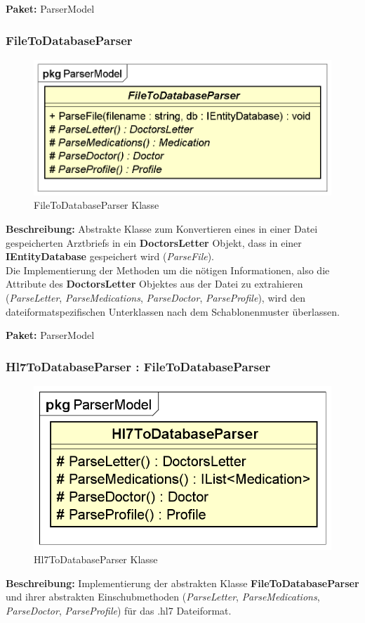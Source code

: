 \documentclass[a4paper]{scrreprt}
\begin{document}
\textbf{Paket:} ParserModel

\subsubsection{FileToDatabaseParser}
\begin{figure}[H]
\centering
\includegraphics[width=0.75\textheight]{graphics/Klassendiagramme/Model/FileToDatabaseParser.png}
\caption{FileToDatabaseParser Klasse}
\end{figure}
\textbf{Beschreibung:} Abstrakte Klasse zum Konvertieren eines in einer Datei gespeicherten Arztbriefs in ein \textbf{DoctorsLetter} Objekt, dass in einer \textbf{IEntityDatabase} gespeichert wird (\textit{ParseFile}).\\
Die Implementierung der Methoden um die nötigen Informationen, also die Attribute des \textbf{DoctorsLetter} Objektes aus der Datei zu extrahieren (\textit{ParseLetter}, \textit{ParseMedications}, \textit{ParseDoctor}, \textit{ParseProfile}), wird den dateiformatspezifischen Unterklassen nach dem Schablonenmuster überlassen.

\textbf{Paket:} ParserModel

\subsubsection{Hl7ToDatabaseParser : FileToDatabaseParser}
\begin{figure}[H]
\centering
\includegraphics[width=0.75\textheight]{graphics/Klassendiagramme/Model/Hl7ToDatabaseParser.png}
\caption{Hl7ToDatabaseParser Klasse}
\end{figure}
\textbf{Beschreibung:} Implementierung der abstrakten Klasse \textbf{FileToDatabaseParser} und ihrer abstrakten Einschubmethoden (\textit{ParseLetter}, \textit{ParseMedications}, \textit{ParseDoctor}, \textit{ParseProfile}) für das .hl7 Dateiformat.
\end{document}
